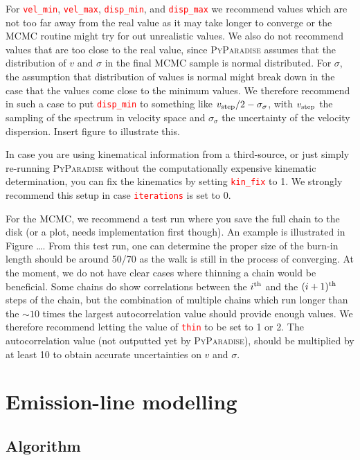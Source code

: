 \documentclass[usenatbib,usegraphicx,useAMS,onecolumn]{mn2e}
\newcommand{\codeline}[1]{\lstinline|#1|}
\newcommand{\paramdef}[1]{\textcolor{red}{\codeline{#1}}}
\begin{document}
For \paramdef{vel_min}, \paramdef{vel_max}, \paramdef{disp_min}, and \paramdef{disp_max} we recommend values which are not too far away from the real value as it may take longer to converge or the MCMC routine might try for out unrealistic values.
We also do not recommend values that are too close to the real value, since \textsc{PyParadise} assumes that the distribution of $v$ and $\sigma$ in the final MCMC sample is normal distributed.
For $\sigma$, the assumption that distribution of values is normal might break down in the case that the values come close to the minimum values.
We therefore recommend in such a case to put \paramdef{disp_min} to something like $v_{\rm step} / 2 - \sigma_{\sigma}$, with $v_{\rm step}$ the sampling of the spectrum in velocity space and $\sigma_{\sigma}$ the uncertainty of the velocity dispersion.
Insert figure to illustrate this.

In case you are using kinematical information from a third-source, or just simply re-running \textsc{PyParadise} without the computationally expensive kinematic determination, you can fix the kinematics by setting \paramdef{kin_fix} to 1.
We strongly recommend this setup in case \paramdef{iterations} is set to 0.

For the MCMC, we recommend a test run where you save the full chain to the disk (or a plot, needs implementation first though).
An example is illustrated in Figure \dots.
From this test run, one can determine the proper size of the burn-in length should be around 50/70 as the walk is still in the process of converging.
At the moment, we do not have clear cases where thinning a chain would be beneficial.
Some chains do show correlations between the $i^{\rm th}$ and the $(i + 1)^{\rm th}$ steps of the chain, but the combination of multiple chains which run longer than the $\sim 10$ times the largest autocorrelation value should provide enough values.
We therefore recommend letting the value of \paramdef{thin} to be set to 1 or 2.
The autocorrelation value (not outputted yet by \textsc{PyParadise}), should be multiplied by at least 10 to obtain accurate uncertainties on $v$ and $\sigma$.

\section{Emission-line modelling}
\label{sec:em}
\subsection{Algorithm}
\label{subsec:em_algo}
\end{document}
